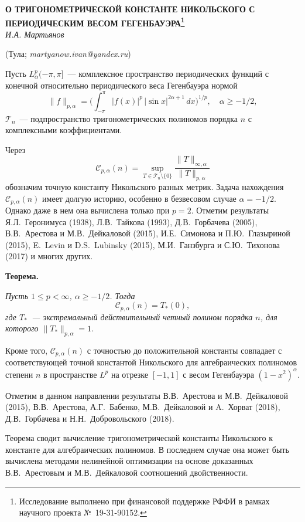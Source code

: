 \begin{center}
    {\bf О ТРИГОНОМЕТРИЧЕСКОЙ КОНСТАНТЕ НИКОЛЬСКОГО С ПЕРИОДИЧЕСКИМ ВЕСОМ ГЕГЕНБАУЭРА\footnote{Исследование выполнено при финансовой поддержке РФФИ в рамках научного проекта №~19-31-90152.}}\\

    {\it И.А. Мартьянов}

    (Тула; {\it martyanow.ivan@yandex.ru})
\end{center}


Пусть $L_{\alpha}^{p}(-\pi,\pi]$~--- комплексное пространство периодических
функций с конечной относительно периодического веса Гегенбауэра нормой
\[
\|f\|_{p,\alpha}=\biggl(\int_{-\pi}^{\pi}|f(x)|^{p}\,|\!\sin
x|^{2\alpha+1}\,dx\biggr)^{1/p},\quad \alpha\ge -1/2,
\]
$\mathcal{T}_{n}$~--- подпространство тригонометрических полиномов порядка $n$
с комплексными коэффициентами.

Через
\[
\mathcal{C}_{p,\alpha}(n)=\sup_{T\in \mathcal{T}_{n}\setminus \{0\}}
\frac{\|T\|_{\infty,\alpha}}{\|T\|_{p,\alpha}}
\]
обозначим точную константу Никольского разных метрик. Задача нахождения
$\mathcal{C}_{p,\alpha}(n)$ имеет долгую историю, особенно в безвесовом случае
$\alpha=-1/2$. Однако даже в нем она вычислена только при $p=2$. Отметим
результаты Я.Л.~Геронимуса (1938), Л.В.~Тайкова (1993), Д.В.~Горбачева (2005),
В.В.~Арестова и М.В.~Дейкаловой (2015), И.Е.~Симонова и П.Ю.~Глазыриной (2015),
E.~Levin и D.S.~Lubinsky (2015), М.И.~Ганзбурга и С.Ю.~Тихонова (2017) и многих
других.

\textbf{Теорема.} {\it Пусть $1\le p<\infty$, $\alpha\ge -1/2$. Тогда
\[
\mathcal{C}_{p,\alpha}(n)=T_{*}(0),
\]
где $T_{*}$~--- экстремальный действительный четный полином порядка $n$, для
которого $\|T_{*}\|_{p,\alpha}=1$.

Кроме того, $\mathcal{C}_{p,\alpha}(n)$ с точностью до положительной константы
совпадает с соответствующей точной константой Никольского для алгебраических
полиномов степени $n$ в пространстве $L^{p}$ на отрезке $[-1,1]$ с весом
Гегенбауэра $(1-x^{2})^{\alpha}$.}

Отметим в данном направлении результаты В.В.~Арестова и М.В.~Дейкаловой (2015),
В.В.~Арестова, А.Г.~Бабенко, М.В.~Дейкаловой и A.~Хорват (2018), Д.В.~Горбачева
и Н.Н.~Добровольского (2018).

Теорема сводит вычисление тригонометрической константы Никольского к константе
для алгебраических полиномов. В последнем случае она может быть вычислена
методами нелинейной оптимизации на основе доказанных В.В.~Арестовым и
М.В.~Дейкаловой соотношений двойственности.

